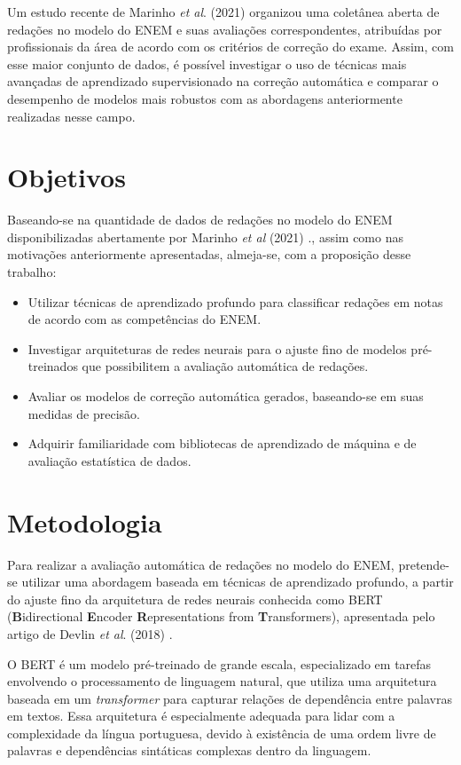 \documentclass{article}
\begin{document}
Um estudo recente de Marinho \textit{et al}. (2021) \cite{Dataset} organizou uma
coletânea aberta de redações no modelo do ENEM e suas avaliações
correspondentes, atribuídas por profissionais da área de acordo com os critérios
de correção do exame. Assim, com esse maior conjunto de dados, é possível
investigar o uso de técnicas mais avançadas de aprendizado supervisionado na
correção automática e comparar o desempenho de modelos mais robustos com as
abordagens anteriormente realizadas nesse campo.

\section{Objetivos}

Baseando-se na quantidade de dados de redações no modelo do ENEM
disponibilizadas abertamente por Marinho \textit{et al} (2021) \cite{Dataset}.,
assim como nas motivações anteriormente apresentadas, almeja-se, com a
proposição desse trabalho:

\begin{itemize}
    \item Utilizar técnicas de aprendizado profundo para classificar redações em
    notas de acordo com as competências do ENEM.
    \item Investigar arquiteturas de redes neurais para o ajuste fino de modelos
    pré-treinados que possibilitem a avaliação automática de redações.
    \item Avaliar os modelos de correção automática gerados, baseando-se em suas
    medidas de precisão.
    \item Adquirir familiaridade com bibliotecas de aprendizado de máquina e de
    avaliação estatística de dados.
\end{itemize}

\section{Metodologia}

Para realizar a avaliação automática de redações no modelo do ENEM, pretende-se
utilizar uma abordagem baseada em técnicas de aprendizado profundo, a partir do
ajuste fino da arquitetura de redes neurais conhecida como BERT
(\textbf{B}idirectional \textbf{E}ncoder \textbf{R}epresentations from
\textbf{T}ransformers), apresentada pelo artigo de Devlin \textit{et al}. (2018)
\cite{BERT}.

O BERT é um modelo pré-treinado de grande escala, especializado em tarefas
envolvendo o processamento de linguagem natural, que utiliza uma arquitetura
baseada em um \textit{transformer} para capturar relações de dependência entre
palavras em textos. Essa arquitetura é especialmente adequada para lidar com a
complexidade da língua portuguesa, devido à existência de uma ordem livre de
palavras e dependências sintáticas complexas dentro da linguagem.
\end{document}
